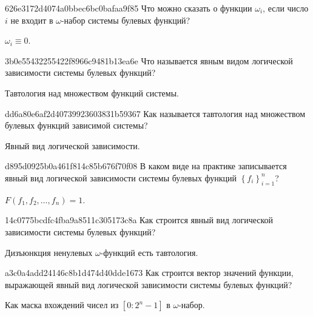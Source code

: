 \begin{note}{626e3172d4074a0bbec6bc0bafaa9f85}
    Что можно сказать о функции \({ \omega_i }\), если число \({ i }\) не входит в \({ \omega }\)-набор системы булевых функций?

    \begin{cloze}{1}
        \({ \omega_i \equiv 0 }\).
    \end{cloze}
\end{note}

\begin{note}{3b0e55432255422f8966c9481b13ea6e}
    Что называется явным видом логической зависимости системы булевых функций?

    \begin{cloze}{1}
        Тавтология над множеством функций системы.
    \end{cloze}
\end{note}

\begin{note}{dd6a80e6af2d40739923603831b59367}
    Как называется тавтология над множеством булевых функций зависимой системы?

    \begin{cloze}{1}
        Явный вид логической зависимости.
    \end{cloze}
\end{note}

\begin{note}{d895d0925b0a461f814c85b676f70f08}
    В каком виде на практике записывается явный вид логической зависимости системы булевых функций \({ \left\{ f_i \right\}_{i=1}^{n} }\)?

    \begin{cloze}{1}
        \({ F(f_1, f_2, \ldots, f_n) = 1 }\).
    \end{cloze}
\end{note}

\begin{note}{14c0775bcdfc4fba9a8511c305173c8a}
    Как строится явный вид логической зависимости системы булевых функций?

    \begin{cloze}{1}
        Дизъюнкция ненулевых \({ \omega }\)-функций есть тавтология.
    \end{cloze}
\end{note}

\begin{note}{a3c0a4add24146c8b1d474d40dde1673}
    Как строится вектор значений функции, выражающей явный вид логической зависимости системы булевых функций?

    \begin{cloze}{1}
        Как маска вхождений чисел из \({ [0 : 2^{n}-1] }\) в \({ \omega }\)-набор.
    \end{cloze}
\end{note}

